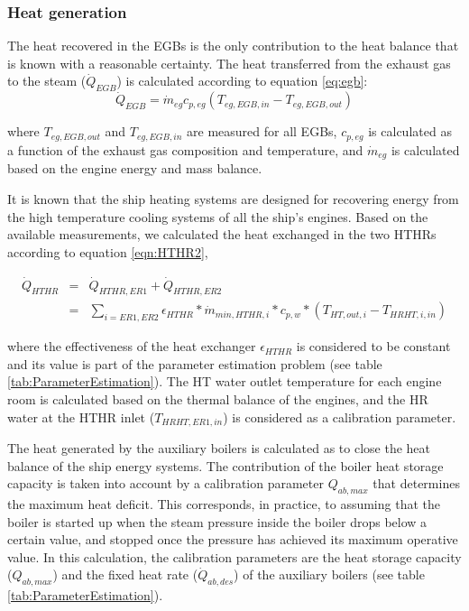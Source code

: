 \documentclass[preprint,12pt]{elsarticle}
\begin{document}
\subsubsection{Heat generation}

The heat recovered in the EGBs is the only contribution to the heat balance that is known with a reasonable certainty. The heat transferred from the exhaust gas to the steam ($\dot{Q}_{EGB}$) is calculated according to equation \ref{eq:egb}:
\begin{equation}
\dot{Q}_{EGB} = \dot{m}_{eg} c_{p,eg} (T_{eg,EGB,in} - T_{eg,EGB,out})
\end{equation}\label{eq:egb}

where $T_{eg,EGB,out}$ and $T_{eg,EGB,in}$ are measured for all EGBs, $c_{p,eg}$ is calculated as a function of the exhaust gas composition and temperature, and $ \dot{m}_{eg} $ is calculated based on the engine energy and mass balance.

It is known that the ship heating systems are designed for recovering energy from the high temperature cooling systems of all the ship's engines. Based on the available measurements, we calculated the heat exchanged in the two HTHRs according to equation \ref{eqn:HTHR2},

\begin{eqnarray}
\dot{Q}_{HTHR} & = & \dot{Q}_{HTHR,ER1} + \dot{Q}_{HTHR,ER2} \label{eqn:HTHR1} \\
& = & \sum_{i=ER1,ER2}{\epsilon_{HTHR} * \dot{m}_{min,HTHR,i} * c_{p,w} * (T_{HT,out,i} - T_{HRHT,i,in})} \label{eqn:HTHR2}
\end{eqnarray}

where the effectiveness of the heat exchanger $\epsilon_{HTHR}$ is considered to be constant and its value is part of the parameter estimation problem (see table \ref{tab:ParameterEstimation}). The HT water outlet temperature for each engine room is calculated based on the thermal balance of the engines, and the HR water at the HTHR inlet ($T_{HRHT,ER1,in}$) is considered as a calibration parameter. 

The heat generated by the auxiliary boilers is calculated as to close the heat balance of the ship energy systems. The contribution of the boiler heat storage capacity is taken into account by a calibration parameter $Q_{ab,max}$ that determines the maximum heat deficit. This corresponds, in practice, to assuming that the boiler is started up when the steam pressure inside the boiler drops below a certain value, and stopped once the pressure has achieved its maximum operative value. In this calculation, the calibration parameters are the heat storage capacity ($Q_{ab,max}$) and the fixed heat rate ($\dot{Q}_{ab,des}$) of the auxiliary boilers (see table \ref{tab:ParameterEstimation}).
\end{document}
